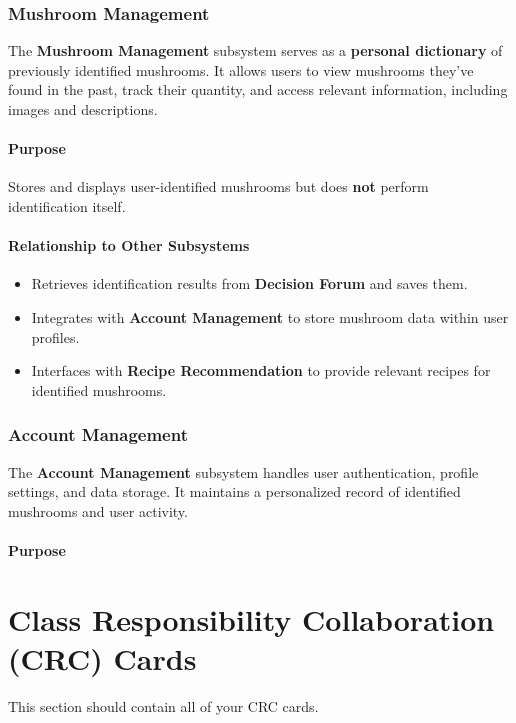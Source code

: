 \documentclass[]{article}
\begin{document}
\subsubsection{Mushroom Management}
The \textbf{Mushroom Management} subsystem serves as a \textbf{personal dictionary} of previously identified mushrooms. It allows users to view mushrooms they’ve found in the past, track their quantity, and access relevant information, including images and descriptions.

\paragraph{Purpose}
Stores and displays user-identified mushrooms but does \textbf{not} perform identification itself.

\paragraph{Relationship to Other Subsystems}
\begin{itemize}
    \item Retrieves identification results from \textbf{Decision Forum} and saves them.
    \item Integrates with \textbf{Account Management} to store mushroom data within user profiles.
    \item Interfaces with \textbf{Recipe Recommendation} to provide relevant recipes for identified mushrooms.
\end{itemize}

\subsubsection{Account Management}
The \textbf{Account Management} subsystem handles user authentication, profile settings, and data storage. It maintains a personalized record of identified mushrooms and user activity.

\paragraph{Purpose}

\clearpage	
\section{Class Responsibility Collaboration (CRC) Cards}
\label{sec:class_responsibility_collaboration_crc_cards}
This section should contain all of your CRC cards.
\end{document}
